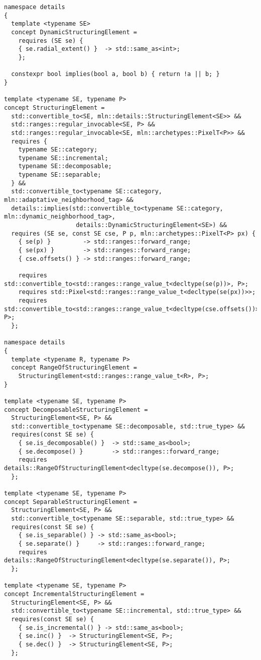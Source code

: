 \begin{verbatim}
namespace details
{
  template <typename SE>
  concept DynamicStructuringElement =
    requires (SE se) {
    { se.radial_extent() }  -> std::same_as<int>;
    };

  constexpr bool implies(bool a, bool b) { return !a || b; }
}

template <typename SE, typename P>
concept StructuringElement =
  std::convertible_to<SE, mln::details::StructuringElement<SE>> &&
  std::ranges::regular_invocable<SE, P> &&
  std::ranges::regular_invocable<SE, mln::archetypes::PixelT<P>> &&
  requires {
    typename SE::category;
    typename SE::incremental;
    typename SE::decomposable;
    typename SE::separable;
  } &&
  std::convertible_to<typename SE::category, mln::adaptative_neighborhood_tag> &&
  details::implies(std::convertible_to<typename SE::category, mln::dynamic_neighborhood_tag>,
                    details::DynamicStructuringElement<SE>) &&
  requires (SE se, const SE cse, P p, mln::archetypes::PixelT<P> px) {
    { se(p) }         -> std::ranges::forward_range;
    { se(px) }        -> std::ranges::forward_range;
    { cse.offsets() } -> std::ranges::forward_range;

    requires std::convertible_to<std::ranges::range_value_t<decltype(se(p))>, P>;
    requires std::Pixel<std::ranges::range_value_t<decltype(se(px))>>;
    requires std::convertible_to<std::ranges::range_value_t<decltype(cse.offsets())>, P>;
  };

namespace details
{
  template <typename R, typename P>
  concept RangeOfStructuringElement =
    StructuringElement<std::ranges::range_value_t<R>, P>;
}

template <typename SE, typename P>
concept DecomposableStructuringElement =
  StructuringElement<SE, P> &&
  std::convertible_to<typename SE::decomposable, std::true_type> &&
  requires(const SE se) {
    { se.is_decomposable() }  -> std::same_as<bool>;
    { se.decompose() }        -> std::ranges::forward_range;
    requires details::RangeOfStructuringElement<decltype(se.decompose()), P>;
  };

template <typename SE, typename P>
concept SeparableStructuringElement =
  StructuringElement<SE, P> &&
  std::convertible_to<typename SE::separable, std::true_type> &&
  requires(const SE se) {
    { se.is_separable() } -> std::same_as<bool>;
    { se.separate() }     -> std::ranges::forward_range;
    requires details::RangeOfStructuringElement<decltype(se.separate()), P>;
  };

template <typename SE, typename P>
concept IncrementalStructuringElement =
  StructuringElement<SE, P> &&
  std::convertible_to<typename SE::incremental, std::true_type> &&
  requires(const SE se) {
    { se.is_incremental() } -> std::same_as<bool>;
    { se.inc() }  -> StructuringElement<SE, P>;
    { se.dec() }  -> StructuringElement<SE, P>;
  };
\end{verbatim}

